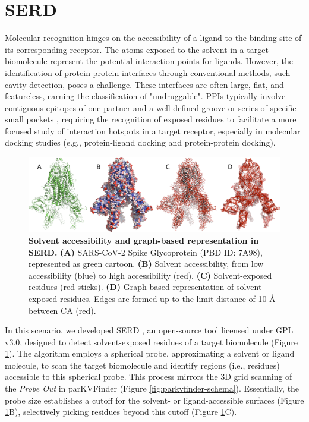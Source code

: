 \documentclass[Ingles]{phdthesis}
\def\ie{i.e.\onedot}
\def\eg{e.g.\onedot}
\begin{document}
\section{SERD \label{sec:serd}}

Molecular recognition hinges on the accessibility of a ligand to the binding site of its corresponding receptor. The atoms exposed to the solvent in a target biomolecule represent the potential interaction points for ligands. However, the identification of protein-protein interfaces through conventional methods, such cavity detection, poses a challenge. These interfaces are often large, flat, and featureless, earning the classification of "undruggable". \acsp{PPI} typically involve contiguous epitopes of one partner and a well-defined groove or series of specific small pockets \cite{jubb2012}, requiring the recognition of exposed residues to facilitate a more focused study of interaction hotspots in a target receptor, especially in molecular docking studies (\eg, protein-ligand docking and protein-protein docking).

\begin{figure}[h]
  \centering
  \includegraphics[scale=0.475]{images/serd-spyke.png}
  \caption[Solvent accessibility and graph-based representation in SERD.]{\textbf{Solvent accessibility and graph-based representation in SERD.} \textbf{(A)} SARS-CoV-2 Spike Glycoprotein (PBD ID: 7A98), represented as green cartoon. \textbf{(B)} Solvent accessibility, from low accessibility (blue) to high accessibility (red). \textbf{(C)} Solvent-exposed residues (red sticks). \textbf{(D)} Graph-based representation of solvent-exposed residues. Edges are formed up to the limit distance of 10 Å between \acs{CA} (red).}
  \label{fig:serd-spyke}
\end{figure}

In this scenario, we developed \ac{SERD} \cite{SERD}, an open-source tool licensed under GPL v3.0, designed to detect solvent-exposed residues of a target biomolecule (Figure \ref{fig:serd-spyke}). The algorithm employs a spherical probe, approximating a solvent or ligand molecule, to scan the target biomolecule and identify regions (\ie, residues) accessible to this spherical probe. This process mirrors the 3D grid scanning of the \textit{Probe Out} in parKVFinder (Figure \ref{fig:parkvfinder-schema}). Essentially, the probe size establishes a cutoff for the solvent- or ligand-accessible surfaces (Figure \ref{fig:serd-spyke}B), selectively picking residues beyond this cutoff (Figure \ref{fig:serd-spyke}C).
\end{document}
